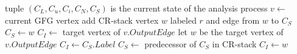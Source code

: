 \begin{algorithmic}
	
	\State tuple $(C_L, C_u, C_i, C_N, C_S)$ is the current state of the analysis process
	\State $v \gets$ current GFG vertex
					\State {}
				\EndFor
			\EndCase
				\State add CR-stack vertex $w$ labeled $r$ and edge from $w$ to $C_S$
				\State $C_S \gets w$
				\State $C_I \gets$ target vertex of $v.OutputEdge$
				\State {}
			\EndCase
				\State let $w$ be the target vertex of $v.OutputEdge$
					\State $C_I \gets C_S.Label$
					\State $C_S \gets$ predecessor of $C_S$ in CR-stack
					\State {}
				\Else
					\State $C_I \gets w$
				\EndIf
			\EndCase
			\Case{\_}
				\State \Return
			\EndCase
		\EndSwitch
	\EndIf
\EndProcedure
\end{algorithmic}
